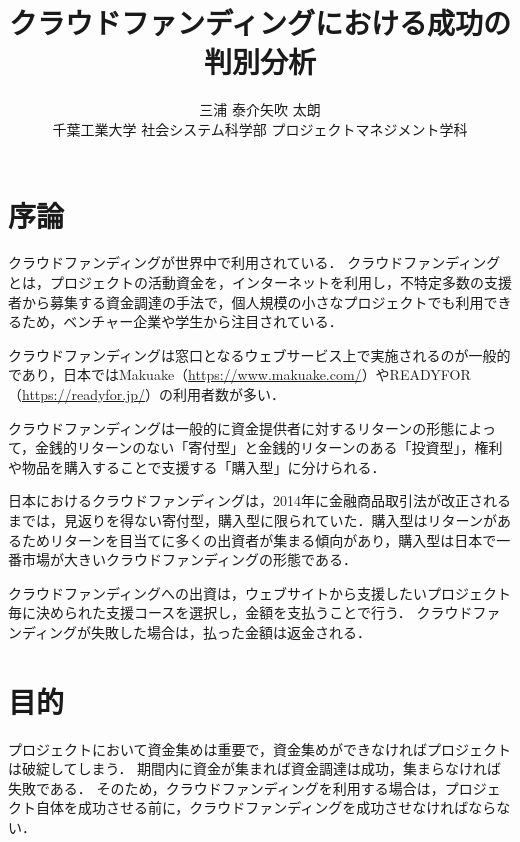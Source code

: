 \documentclass[uplatex,twocolumn]{jsarticle}
\title{\vspace{-10mm}クラウドファンディングにおける成功の判別分析\footnotemark[0]}%
\author{\large{三浦 泰介\footnotemark[2]\qquad 矢吹 太朗}\\千葉工業大学 社会システム科学部 プロジェクトマネジメント学科\footnotemark[3]}%
\date{}
\begin{document}
\twocolumn[\maketitle]

\begingroup
\def\thefootnote{\fnsymbol{footnote}}
\endgroup

\section{序論}
クラウドファンディングが世界中で利用されている\cite{kaihatu}．
クラウドファンディングとは，プロジェクトの活動資金を，インターネットを利用し，不特定多数の支援者から募集する資金調達の手法で，個人規模の小さなプロジェクトでも利用できるため，ベンチャー企業や学生から注目されている．

クラウドファンディングは窓口となるウェブサービス上で実施されるのが一般的であり，日本ではMakuake（\url{https://www.makuake.com/}）やREADYFOR（\url{https://readyfor.jp/}）の利用者数が多い．

クラウドファンディングは一般的に資金提供者に対するリターンの形態によって，金銭的リターンのない「寄付型」と金銭的リターンのある「投資型」，権利や物品を購入することで支援する「購入型」に分けられる．

日本におけるクラウドファンディングは，2014年に金融商品取引法が改正されるまで\cite{kisei}は，見返りを得ない寄付型，購入型に限られていた．購入型はリターンがあるためリターンを目当てに多くの出資者が集まる傾向があり，購入型は日本で一番市場が大きいクラウドファンディングの形態である．

クラウドファンディングへの出資は，ウェブサイトから支援したいプロジェクト毎に決められた支援コースを選択し，金額を支払うことで行う．
クラウドファンディングが失敗した場合は，払った金額は返金される．





\section{目的}
プロジェクトにおいて資金集めは重要で，資金集めができなければプロジェクトは破綻してしまう．
期間内に資金が集まれば資金調達は成功，集まらなければ失敗である．
そのため，クラウドファンディングを利用する場合は，プロジェクト自体を成功させる前に，クラウドファンディングを成功させなければならない．
\end{document}
